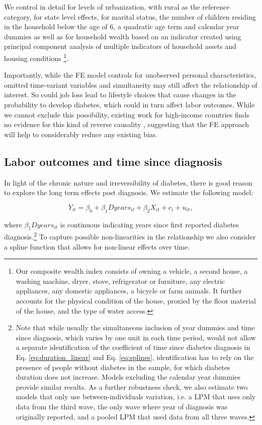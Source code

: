 \documentclass[12pt,english]{article}
\begin{document}
We control in detail for levels of urbanization, with rural as the reference category, for state level effects, for marital status, the number of children residing in the household below the age of 6, a quadratic age term and calendar year dummies as well as for household wealth based on an indicator created using principal component analysis of multiple indicators of household assets and housing conditions \parencite{Filmer2001}\footnote{Our composite wealth index consists of owning a vehicle, a second house, a washing machine, dryer, stove, refrigerator or furniture, any electric appliances, any domestic appliances, a bicycle or farm animals. It further accounts for the physical condition of the house, proxied by the floor material of the house, and the type of water access.}. 

Importantly, while the \ac{FE} model controls for unobserved personal characteristics, omitted time-variant variables and simultaneity may still affect the relationship of interest. So could job loss lead to lifestyle choices that cause changes in the probability to develop diabetes, which could in turn affect labor outcomes. While we cannot exclude this possibility, existing work for high-income countries finds no evidence for this kind of reverse causality \parencite{Bergemann2011,Schaller2015}, suggesting that the \ac{FE} approach will help to considerably reduce any existing bias.


\subsection{Labor outcomes and time since diagnosis}

In light of the chronic nature and irreversibility of diabetes, there is good reason to explore the long term effects post diagnosis.  We estimate the following model:

\begin{equation}
Y_{it}=\beta_{0}+\beta_{1}Dyears_{it}+\beta_{2}X_{it}+c_{i}+u_{it},\label{eq:duration_linear}
\end{equation}

where $\beta_{1}Dyears_{it}$ is continuous indicating years since first reported diabetes diagnosis.\footnote{Note that while usually the simultaneous inclusion of year dummies and time since diagnosis, which varies by one unit in each time period, would not allow a separate identification of the coefficient of time since diabetes diagnosis in Eq. \ref{eq:duration_linear} and Eq.  \ref{eq:splines}, identification has to rely on the presence of people without diabetes in the sample, for which diabetes duration does not increase.  Models excluding the calendar year dummies provide similar results.  As a further robustness check, we also estimate two models that only use between-individuals variation, i.e. a \ac{LPM} that uses only data from the third wave, the only wave where year of diagnosis was originally reported, and a pooled \ac{LPM} that used data from all three waves.} To capture possible non-linearities in the relationship we also consider a spline function that allows for non-linear effects over time.
\end{document}
